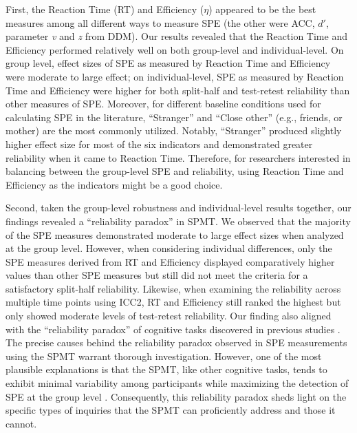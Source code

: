 \documentclass[sn-apa]{sn-jnl}%
\theoremstyle{thmstyleone}%
\theoremstyle{thmstyletwo}%
\theoremstyle{thmstylethree}%
\begin{document}
First, the Reaction Time (RT) and Efficiency ($\eta$) appeared to be the best measures among all different ways to measure SPE (the other were ACC, $d'$, parameter \textit{v} and \textit{z} from DDM). Our results revealed that the Reaction Time and Efficiency performed relatively well on both group-level and individual-level. On group level, effect sizes of SPE as measured by Reaction Time and Efficiency were moderate to large effect; on individual-level, SPE as measured by Reaction Time and Efficiency were higher for both split-half and test-retest reliability than other measures of SPE. Moreover, for different baseline conditions used for calculating SPE in the literature, ``Stranger” and ``Close other” (e.g., friends, or mother) are the most commonly utilized. Notably, ``Stranger” produced slightly higher effect size for most of the six indicators and demonstrated greater reliability when it came to Reaction Time. Therefore, for researchers interested in balancing between the group-level SPE and reliability, using Reaction Time and Efficiency as the indicators might be a good choice. 

Second, taken the group-level robustness and individual-level results together, our findings revealed a ``reliability paradox” in SPMT. We observed that the majority of the SPE measures demonstrated moderate to large effect sizes when analyzed at the group level. However, when considering individual differences, only the SPE measures derived from RT and Efficiency displayed comparatively higher values than other SPE measures but still did not meet the criteria for a satisfactory split-half reliability. Likewise, when examining the reliability across multiple time points using ICC2, RT and Efficiency still ranked the highest but only showed moderate levels of test-retest reliability. Our finding also aligned with the “reliability paradox” of cognitive tasks discovered in previous studies \parencite{hedge2018reliability,enkavi2019large}. The precise causes behind the reliability paradox observed in SPE measurements using the SPMT warrant thorough investigation. However, one of the most plausible explanations is that the SPMT, like other cognitive tasks, tends to exhibit minimal variability among participants while maximizing the detection of SPE at the group level \parencite{liljequist2019intraclass}. Consequently, this reliability paradox sheds light on the specific types of inquiries that the SPMT can proficiently address and those it cannot.
\end{document}
